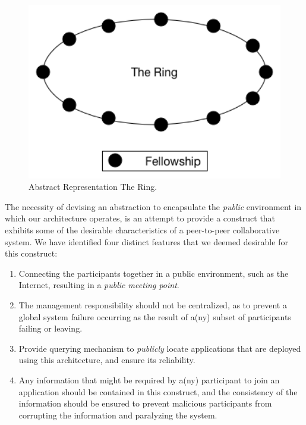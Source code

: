 \documentclass[12pt, titlepage]{uo_temp}
\begin{document}
     \begin{figure}[h]
       \centering
       \includegraphics[width=125mm]{images/arch_ring.png}
       \caption{Abstract Representation The Ring.} 
     \end{figure}

     The necessity of devising an abstraction to encapsulate the \emph{public} environment
     in which our architecture operates, is an attempt to provide a construct that
     exhibits some of the desirable characteristics of a peer-to-peer collaborative
     system. We have identified four distinct features that we deemed desirable for this
     construct:
    
     \begin{enumerate}
     \item Connecting the participants together in a public environment, such as the
       Internet, resulting in a \emph{public meeting point}.
     \item The management responsibility should not be centralized, as to prevent a global
       system failure occurring as the result of a(ny) subset of participants failing or
       leaving.
     \item Provide querying mechanism to \emph{publicly} locate applications that are
       deployed using this architecture, and ensure its reliability.
     \item Any information that might be required by a(ny) participant to join an application
       should be contained in this construct, and the consistency of the information should be
       ensured to prevent malicious participants from corrupting the information and paralyzing the
       system.
     \end{enumerate}
     
\end{document}
